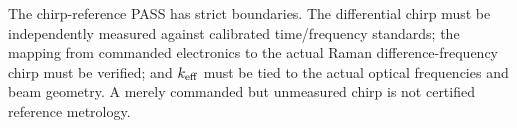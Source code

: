 The chirp-reference PASS has strict boundaries. The differential chirp must be independently measured against calibrated time/frequency standards; the mapping from commanded electronics to the actual Raman difference-frequency chirp must be verified; and $k_{\rm eff}$ must be tied to the actual optical frequencies and beam geometry. A merely commanded but unmeasured chirp is not certified reference metrology.
